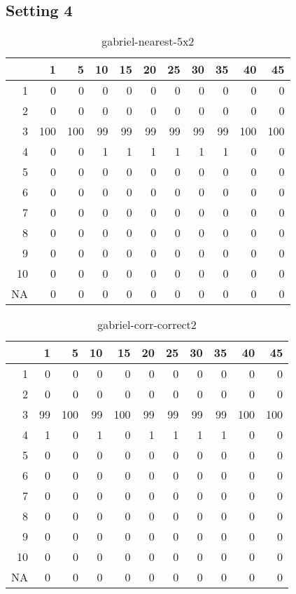 \documentclass[11pt]{article}
\begin{document}
\subsection*{Setting 4}


\begin{table}[H]
\centering
\begin{tabular}{rrrrrrrrrrr}
  \hline
 & 1 & 5 & 10 & 15 & 20 & 25 & 30 & 35 & 40 & 45 \\ 
  \hline
1 & 0 & 0 & 0 & 0 & 0 & 0 & 0 & 0 & 0 & 0 \\ 
  2 & 0 & 0 & 0 & 0 & 0 & 0 & 0 & 0 & 0 & 0 \\ 
  3 & 100 & 100 & 99 & 99 & 99 & 99 & 99 & 99 & 100 & 100 \\ 
  4 & 0 & 0 & 1 & 1 & 1 & 1 & 1 & 1 & 0 & 0 \\ 
  5 & 0 & 0 & 0 & 0 & 0 & 0 & 0 & 0 & 0 & 0 \\ 
  6 & 0 & 0 & 0 & 0 & 0 & 0 & 0 & 0 & 0 & 0 \\ 
  7 & 0 & 0 & 0 & 0 & 0 & 0 & 0 & 0 & 0 & 0 \\ 
  8 & 0 & 0 & 0 & 0 & 0 & 0 & 0 & 0 & 0 & 0 \\ 
  9 & 0 & 0 & 0 & 0 & 0 & 0 & 0 & 0 & 0 & 0 \\ 
  10 & 0 & 0 & 0 & 0 & 0 & 0 & 0 & 0 & 0 & 0 \\ 
  NA & 0 & 0 & 0 & 0 & 0 & 0 & 0 & 0 & 0 & 0 \\ 
   \hline
\end{tabular}
\caption{gabriel-nearest-5x2} 
\end{table}
\begin{table}[H]
\centering
\begin{tabular}{rrrrrrrrrrr}
  \hline
 & 1 & 5 & 10 & 15 & 20 & 25 & 30 & 35 & 40 & 45 \\ 
  \hline
1 & 0 & 0 & 0 & 0 & 0 & 0 & 0 & 0 & 0 & 0 \\ 
  2 & 0 & 0 & 0 & 0 & 0 & 0 & 0 & 0 & 0 & 0 \\ 
  3 & 99 & 100 & 99 & 100 & 99 & 99 & 99 & 99 & 100 & 100 \\ 
  4 & 1 & 0 & 1 & 0 & 1 & 1 & 1 & 1 & 0 & 0 \\ 
  5 & 0 & 0 & 0 & 0 & 0 & 0 & 0 & 0 & 0 & 0 \\ 
  6 & 0 & 0 & 0 & 0 & 0 & 0 & 0 & 0 & 0 & 0 \\ 
  7 & 0 & 0 & 0 & 0 & 0 & 0 & 0 & 0 & 0 & 0 \\ 
  8 & 0 & 0 & 0 & 0 & 0 & 0 & 0 & 0 & 0 & 0 \\ 
  9 & 0 & 0 & 0 & 0 & 0 & 0 & 0 & 0 & 0 & 0 \\ 
  10 & 0 & 0 & 0 & 0 & 0 & 0 & 0 & 0 & 0 & 0 \\ 
  NA & 0 & 0 & 0 & 0 & 0 & 0 & 0 & 0 & 0 & 0 \\ 
   \hline
\end{tabular}
\caption{gabriel-corr-correct2} 
\end{table}
\end{document}
